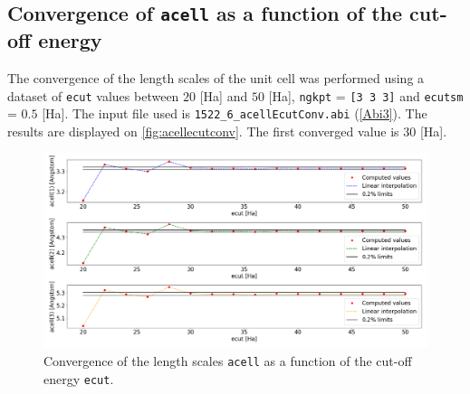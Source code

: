\documentclass[11pt,a4paper]{article}
\begin{document}
\subsection{Convergence of \texttt{acell} as a function of the cut-off energy}
The convergence of the length scales of the unit cell was performed using a dataset of \texttt{ecut} values between $20$ [Ha] and $50$ [Ha], \texttt{ngkpt} = \texttt{[3 3 3]} and \texttt{ecutsm} = $0.5$ [Ha]. The input file used is \texttt{1522\_6\_acellEcutConv.abi} (\autoref{Abi3}). The results are displayed on \autoref{fig:acellecutconv}.
The first converged value is $30$ [Ha].
\begin{figure}
\centering
\includegraphics[width=\textwidth]{images/acellConv.png}
\caption{Convergence of the length scales \texttt{acell} as a function of the cut-off energy \texttt{ecut}.}
\label{fig:acellecutconv}
\end{figure}
\end{document}
